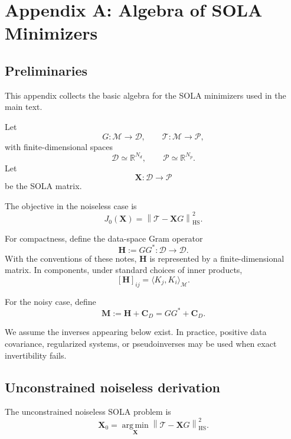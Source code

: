 \documentclass[11pt,openany]{book}
\theoremstyle{definition}
\theoremstyle{remark}
\newcommand{\M}{\mathcal M}
\newcommand{\D}{\mathcal D}
\newcommand{\Pspace}{\mathcal P}
\newcommand{\Tau}{\mathcal{T}}
\newcommand{\HS}{\mathrm{HS}}
\newcommand{\argmin}{\operatorname*{arg\,min}}
\begin{document}

\chapter{Appendix A: Algebra of SOLA Minimizers}

\section{Preliminaries}

This appendix collects the basic algebra for the SOLA minimizers used in the main text.

Let
\[
  G:\M\to\D,
  \qquad
  \Tau:\M\to\Pspace,
\]
with finite-dimensional spaces
\[
  \D\simeq\mathbb R^{N_d},
  \qquad
  \Pspace\simeq\mathbb R^{N_p}.
\]
Let
\[
  \mathbf X:\D\to\Pspace
\]
be the SOLA matrix.

The objective in the noiseless case is
\[
  J_0(\mathbf X)
  =
  \left\|
    \Tau-\mathbf XG
  \right\|_{\HS}^2.
\]

For compactness, define the data-space Gram operator
\[
  \mathbf H:=GG^*:\D\to\D.
\]
With the conventions of these notes, \(\mathbf H\) is represented by a finite-dimensional matrix.
In components, under standard choices of inner products,
\[
  [\mathbf H]_{ij}
  =
  \langle K_j,K_i\rangle_{\M}.
\]

For the noisy case, define
\[
  \mathbf M:=\mathbf H+\mathbf C_D=GG^*+\mathbf C_D.
\]

We assume the inverses appearing below exist. In practice, positive data covariance, regularized
systems, or pseudoinverses may be used when exact invertibility fails.

\section{Unconstrained noiseless derivation}

The unconstrained noiseless SOLA problem is
\[
  \mathbf X_0
  =
  \argmin_{\mathbf X}
  \left\|
    \Tau-\mathbf XG
  \right\|_{\HS}^2.
\]
\end{document}
